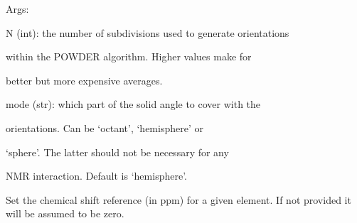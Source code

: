 \documentclass[letterpaper,10pt,english]{sphinxmanual}
\begin{document}
\begin{fulllineitems}
\begin{fulllineitems}
\begin{DUlineblock}{0em}
\item[] Args:
\item[]
\begin{DUlineblock}{\DUlineblockindent}
\item[] N (int): the number of subdivisions used to generate orientations
\item[]
\begin{DUlineblock}{\DUlineblockindent}
\item[] within the POWDER algorithm. Higher values make for
\item[] better but more expensive averages.
\end{DUlineblock}
\item[] mode (str): which part of the solid angle to cover with the
\item[]
\begin{DUlineblock}{\DUlineblockindent}
\item[] orientations. Can be `octant', `hemisphere' or
\item[] `sphere'. The latter should not be necessary for any
\item[] NMR interaction. Default is `hemisphere'.
\end{DUlineblock}
\end{DUlineblock}
\end{DUlineblock}

\end{fulllineitems}


\begin{fulllineitems}
\label{doctree/soprano.calculate.nmr.nmr:soprano.calculate.nmr.nmr.NMRCalculator.set_reference}
Set the chemical shift reference (in ppm) for a given element. If not
provided it will be assumed to be zero.


\end{fulllineitems}
\end{fulllineitems}
\end{document}

